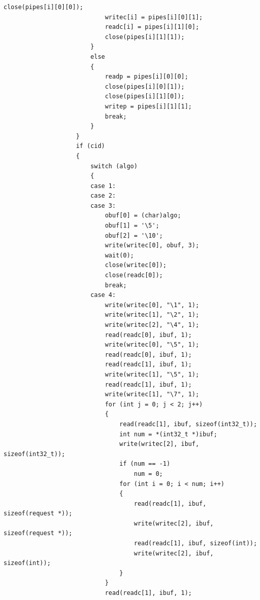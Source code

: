 \documentclass{article}
\begin{document}
\begin{Verbatim}[gobble=8]
                            close(pipes[i][0][0]);
                            writec[i] = pipes[i][0][1];
                            readc[i] = pipes[i][1][0];
                            close(pipes[i][1][1]);
                        }
                        else
                        {
                            readp = pipes[i][0][0];
                            close(pipes[i][0][1]);
                            close(pipes[i][1][0]);
                            writep = pipes[i][1][1];
                            break;
                        }
                    }
                    if (cid)
                    {
                        switch (algo)
                        {
                        case 1:
                        case 2:
                        case 3:
                            obuf[0] = (char)algo;
                            obuf[1] = '\5';
                            obuf[2] = '\10';
                            write(writec[0], obuf, 3);
                            wait(0);
                            close(writec[0]);
                            close(readc[0]);
                            break;
                        case 4:
                            write(writec[0], "\1", 1);
                            write(writec[1], "\2", 1);
                            write(writec[2], "\4", 1);
                            read(readc[0], ibuf, 1);
                            write(writec[0], "\5", 1);
                            read(readc[0], ibuf, 1);
                            read(readc[1], ibuf, 1);
                            write(writec[1], "\5", 1);
                            read(readc[1], ibuf, 1);
                            write(writec[1], "\7", 1);
                            for (int j = 0; j < 2; j++)
                            {
                                read(readc[1], ibuf, sizeof(int32_t));
                                int num = *(int32_t *)ibuf;
                                write(writec[2], ibuf, sizeof(int32_t));
                                if (num == -1)
                                    num = 0;
                                for (int i = 0; i < num; i++)
                                {
                                    read(readc[1], ibuf, sizeof(request *));
                                    write(writec[2], ibuf, sizeof(request *));
                                    read(readc[1], ibuf, sizeof(int));
                                    write(writec[2], ibuf, sizeof(int));
                                }
                            }
                            read(readc[1], ibuf, 1);

\end{Verbatim}
\end{document}
